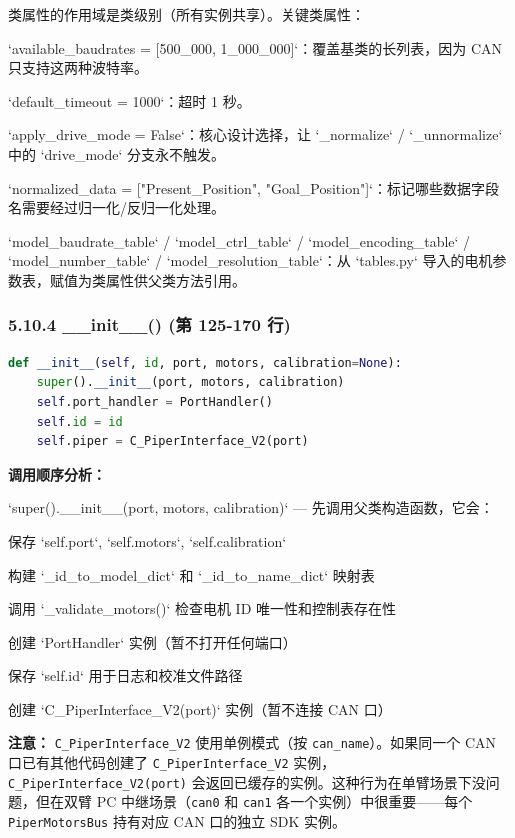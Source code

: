 \documentclass[UTF8,a4paper,11pt]{ctexart}
\begin{document}
{类属性的作用域是类级别（所有实例共享）。关键类属性：

\item `available_baudrates = [500_000, 1_000_000]`：覆盖基类的长列表，因为 CAN 只支持这两种波特率。
\item `default_timeout = 1000`：超时 1 秒。
\item `apply_drive_mode = False`：核心设计选择，让 `_normalize` / `_unnormalize` 中的 `drive_mode` 分支永不触发。
\item `normalized_data = ["Present_Position", "Goal_Position"]`：标记哪些数据字段名需要经过归一化/反归一化处理。
\item `model_baudrate_table` / `model_ctrl_table` / `model_encoding_table` / `model_number_table` / `model_resolution_table`：从 `tables.py` 导入的电机参数表，赋值为类属性供父类方法引用。

\subsubsection{5.10.4 __init__() (第 125-170 行)}

\begin{lstlisting}[language=python]
def __init__(self, id, port, motors, calibration=None):
    super().__init__(port, motors, calibration)
    self.port_handler = PortHandler()
    self.id = id
    self.piper = C_PiperInterface_V2(port)
\end{lstlisting}

\textbf{调用顺序分析：}

\item[1] `super().__init__(port, motors, calibration)` — 先调用父类构造函数，它会：
\item 保存 `self.port`, `self.motors`, `self.calibration`
\item 构建 `_id_to_model_dict` 和 `_id_to_name_dict` 映射表
\item 调用 `_validate_motors()` 检查电机 ID 唯一性和控制表存在性
\item[2] 创建 `PortHandler` 实例（暂不打开任何端口）
\item[3] 保存 `self.id` 用于日志和校准文件路径
\item[4] 创建 `C_PiperInterface_V2(port)` 实例（暂不连接 CAN 口）

\textbf{注意：} \texttt{C_PiperInterface_V2} 使用单例模式（按 \texttt{can_name}）。如果同一个 CAN 口已有其他代码创建了 \texttt{C_PiperInterface_V2} 实例，\texttt{C_PiperInterface_V2(port)} 会返回已缓存的实例。这种行为在单臂场景下没问题，但在双臂 PC 中继场景（\texttt{can0} 和 \texttt{can1} 各一个实例）中很重要——每个 \texttt{PiperMotorsBus} 持有对应 CAN 口的独立 SDK 实例。

}
\end{document}
